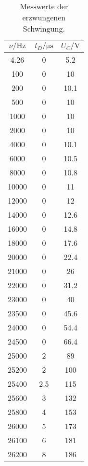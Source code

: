 \begin{table}[h]
  \centering
  \begin{tabular}{c c c}
    \toprule
    $\nu/\si{\hertz}$ & $t_D/\si{\micro\second}$ & $U_C/\si{\volt}$ \\
    \midrule
    4.26 & 0 & 5.2 \\
    100 & 0 & 10 \\
    200 & 0 & 10.1 \\
    500 & 0 & 10 \\
    1000 & 0 & 10 \\
    2000 & 0 & 10 \\
    4000 & 0 & 10.1 \\
    6000 & 0 & 10.5 \\
    8000 & 0 & 10.8 \\
    10000 & 0 & 11 \\
    12000 & 0 & 12 \\
    14000 & 0 & 12.6 \\
    16000 & 0 & 14.8 \\
    18000 & 0 & 17.6 \\
    20000 & 0 & 22.4 \\
    21000 & 0 & 26 \\
    22000 & 0 & 31.2 \\
    23000 & 0 & 40 \\
    23500 & 0 & 45.6 \\
    24000 & 0 & 54.4 \\
    24500 & 0 & 66.4 \\
    25000 & 2 & 89 \\
    25200 & 2 & 100 \\
    25400 & 2.5 & 115 \\
    25600 & 3 & 132 \\
    25800 & 4 & 153 \\
    26000 & 5 & 173 \\
    26100 & 6 & 181 \\
    26200 & 8 & 186 \\
    \bottomrule
  \end{tabular}
  \caption{Messwerte der erzwungenen Schwingung.}
  \label{tab:Messung3a}
\end{table}

